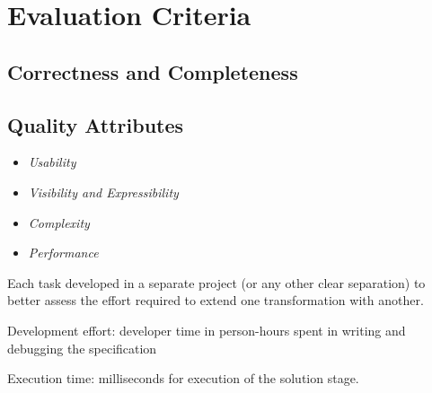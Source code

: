 
\section{Evaluation Criteria}
\label{sec:EvaluationCriteria}

\subsection{Correctness and Completeness}


\subsection{Quality Attributes}

\begin{itemize}
  \item \emph{Usability}
  \item \emph{Visibility and Expressibility}
  \item \emph{Complexity}
  \item \emph{Performance}
\end{itemize}


Each task developed in a separate project (or any other clear separation) to better assess the effort required to extend one transformation with another.

Development effort: developer time in person-hours spent in writing and debugging the specification

Execution time: milliseconds for execution of the solution stage.